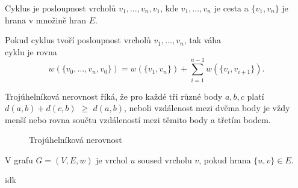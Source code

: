 \begin{definition}[Cyklus]
    \label{definice:cyklus}
    Cyklus je posloupnost vrcholů $v_1,\ldots,v_n,v_1$, kde $v_1,\ldots,v_n$ je cesta a  $\{v_1,v_n\}$ je hrana v množině hran $E$.
\end{definition}

\begin{definition}
    \label{definice:vaha_cyklu}
    Pokud cyklus tvoří posloupnost vrcholů $v_1, \ldots, v_n$, tak váha \\cyklu je rovna \[ w(\{v_0,\dots ,v_n, v_0\}) = w(\{v_1, v_n\}) + \sum_{i=1}^{n-1}w(\{v_i, v_{i+1}\}). \]
    
\end{definition}

\begin{definition}
    \label{definice:trojuhelnikova_nerovnost}
    Trojúhelníková nerovnost říká, že pro kaž\-dé tři různé body $a, b, c$ platí \textcolor{myblue}{$d(a, b)+d(c, b)$} $\geq$ \textcolor{myred}{$d(a,b)$}, neboli vzdálenost mezi dvěma body je vždy menší nebo rovna součtu vzdáleností mezi těmito body a třetím bodem. 

    \begin{figure}[h]
        \centering
        \caption{Trojúhelníková nerovnost}
    \end{figure}

\end{definition}
\begin{definition}[Soused]
    \label{definice:soused}
    V grafu $G = (V, E, w)$ je vrchol $u$ soused vrcholu $v$, pokud hrana $\{u, v\} \in E$.
\end{definition}

\begin{definition}
    \label{definice:bigonotation}
    idk
\end{definition}

